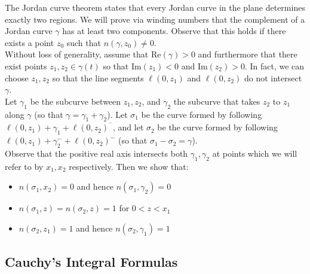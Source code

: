 \documentclass{memoir}
\begin{document}
\begin{exmp}
	The Jordan curve theorem states that every Jordan curve in the plane determines exactly two regions. We will prove via winding numbers that the complement of a Jordan curve \(\gamma \) has at least two components. Observe that this holds if there exists a point \(z_0\) such that \(n(\gamma ,z_0)\neq 0\).\\

	Without loss of generality, assume that \(\textrm{Re}(\gamma )>0\) and furthermore that there exist points \(z_1,z_2 \in \gamma (t)\) so that \(\textrm{Im}(z_1)<0\) and \(\textrm{Im}(z_2)>0\). In fact, we can choose \(z_1,z_2\) so that the line segments \(\ell(0,z_1)\) and \(\ell(0,z_2)\) do not intersect \(\gamma \).\\

	Let \(\gamma_1\) be the subcurve between \(z_1,z_2\), and \(\gamma_2\) the subcurve that takes \(z_2\) to \(z_1\) along \(\gamma \) (so that \(\gamma = \gamma_1+\gamma_2\)). Let \(\sigma_1\) be the curve formed by following \(\ell(0,z_1) + \gamma_1 + \ell(0,z_2)^{^{-}}\), and let \(\sigma_2\) be the curve formed by following \(\ell(0,z_1) + \gamma_2^{-} + \ell(0,z_2)^{-}\) (so that \(\sigma_1-\sigma_2 = \gamma \)).\\

	Observe that the positive real axis intersects both \(\gamma_1,\gamma_2\) at points which we will refer to by \(x_1,x_2\) respectively. Then we show that:
	\begin{itemize}
		\item \(n(\sigma_1,x_2) = 0\) and hence \(n(\sigma_1,\gamma_2) = 0\) 
		\item \(n(\sigma_1,z) = n(\sigma_2,z) = 1\) for \(0<z<x_1\)
		\item \(n(\sigma_2,z_1) = 1\) and hence \(n(\sigma_2,\gamma_1) = 1\) 
	\end{itemize}
\end{exmp}

\subsection{Cauchy's Integral Formulas}
\label{sub:cauchy_s_integral_formulas}
\end{document}
